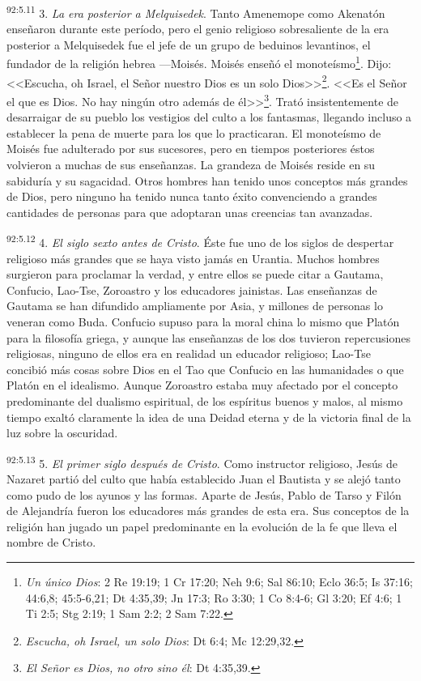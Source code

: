 \documentclass[twoside, 11pt]{book}
\begin{document}
\par
\textsuperscript{92:5.11} 3. \textit{La era posterior a Melquisedek}. Tanto Amenemope como Akenatón enseñaron durante este período, pero el genio religioso sobresaliente de la era posterior a Melquisedek fue el jefe de un grupo de beduinos levantinos, el fundador de la religión hebrea ---Moisés. Moisés enseñó el monoteísmo\footnote{\textit{Un único Dios}: 2 Re 19:19; 1 Cr 17:20; Neh 9:6; Sal 86:10; Eclo 36:5; Is 37:16; 44:6,8; 45:5-6,21; Dt 4:35,39; Jn 17:3; Ro 3:30; 1 Co 8:4-6; Gl 3:20; Ef 4:6; 1 Ti 2:5; Stg 2:19; 1 Sam 2:2; 2 Sam 7:22.}. Dijo: <<Escucha, oh Israel, el Señor nuestro Dios es un solo Dios>>\footnote{\textit{Escucha, oh Israel, un solo Dios}: Dt 6:4; Mc 12:29,32.}. <<Es el Señor el que es Dios. No hay ningún otro además de él>>\footnote{\textit{El Señor es Dios, no otro sino él}: Dt 4:35,39.}. Trató insistentemente de desarraigar de su pueblo los vestigios del culto a los fantasmas, llegando incluso a establecer la pena de muerte para los que lo practicaran. El monoteísmo de Moisés fue adulterado por sus sucesores, pero en tiempos posteriores éstos volvieron a muchas de sus enseñanzas. La grandeza de Moisés reside en su sabiduría y su sagacidad. Otros hombres han tenido unos conceptos más grandes de Dios, pero ninguno ha tenido nunca tanto éxito convenciendo a grandes cantidades de personas para que adoptaran unas creencias tan avanzadas.

\par
\textsuperscript{92:5.12} 4. \textit{El siglo sexto antes de Cristo}. Éste fue uno de los siglos de despertar religioso más grandes que se haya visto jamás en Urantia. Muchos hombres surgieron para proclamar la verdad, y entre ellos se puede citar a Gautama, Confucio, Lao-Tse, Zoroastro y los educadores jainistas. Las enseñanzas de Gautama se han difundido ampliamente por Asia, y millones de personas lo veneran como Buda. Confucio supuso para la moral china lo mismo que Platón para la filosofía griega, y aunque las enseñanzas de los dos tuvieron repercusiones religiosas, ninguno de ellos era en realidad un educador religioso; Lao-Tse concibió más cosas sobre Dios en el Tao que Confucio en las humanidades o que Platón en el idealismo. Aunque Zoroastro estaba muy afectado por el concepto predominante del dualismo espiritual, de los espíritus buenos y malos, al mismo tiempo exaltó claramente la idea de una Deidad eterna y de la victoria final de la luz sobre la oscuridad.

\par
\textsuperscript{92:5.13} 5. \textit{El primer siglo después de Cristo}. Como instructor religioso, Jesús de Nazaret partió del culto que había establecido Juan el Bautista y se alejó tanto como pudo de los ayunos y las formas. Aparte de Jesús, Pablo de Tarso y Filón de Alejandría fueron los educadores más grandes de esta era. Sus conceptos de la religión han jugado un papel predominante en la evolución de la fe que lleva el nombre de Cristo.
\end{document}
